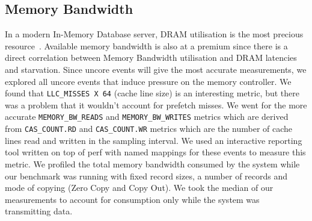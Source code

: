 


\subsection{Memory Bandwidth}
In a modern In-Memory Database server, DRAM utilisation is the most precious resource~\cite{ramcloudfast}. 
 Available memory bandwidth is also at a premium since there is a direct correlation between Memory Bandwidth
 utilisation and DRAM latencies and starvation. Since uncore events will give the most accurate measurements,
 we explored all uncore events that induce pressure on the memory controller. We found that 
\texttt{LLC\_MISSES X 64} (cache line size) is an interesting metric, but there was a problem that it wouldn't account for prefetch 
 misses. We went for the more accurate \texttt{MEMORY\_BW\_READS} and \texttt{MEMORY\_BW\_WRITES} metrics which are derived from 
 \texttt{CAS\_COUNT.RD} and \texttt{CAS\_COUNT.WR} metrics which are the number of cache lines read and written in the sampling 
 interval. We used an interactive reporting tool written on top of perf with named mappings for these events
 to measure this metric. We profiled the total memory bandwidth consumed by the system while our benchmark 
 was running with fixed record sizes, a number of records and mode of copying (Zero Copy and Copy Out). We took the median of our measurements 
 to account for consumption only while the system was transmitting data.


